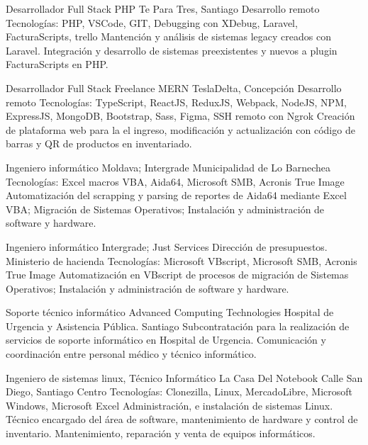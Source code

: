 \documentclass[draft,color,12pt,letterpaper,sans]{moderncv}
\begin{document}
{Desarrollador Full Stack PHP}
{Te Para Tres, Santiago}
{\newline Desarrollo remoto}
{\newline Tecnologías: PHP, VSCode, GIT, Debugging con XDebug, Laravel, FacturaScripts, trello}
{Mantención y análisis de sistemas legacy creados con Laravel. Integración y desarrollo de sistemas preexistentes y nuevos a plugin FacturaScripts en PHP.\newline}

{Desarrollador Full Stack Freelance MERN}
{TeslaDelta, Concepción}
{\newline Desarrollo remoto}
{\newline Tecnologías: TypeScript, ReactJS, ReduxJS, Webpack, NodeJS, NPM, ExpressJS, MongoDB, Bootstrap, Sass, Figma, SSH remoto con Ngrok}
{Creación de plataforma web para la el ingreso, modificación y actualización con código de barras y QR de productos en inventariado.\newline}

{Ingeniero informático}
{Moldava; Intergrade}
{Municipalidad de Lo Barnechea}
{\newline Tecnologías: Excel macros VBA, Aida64, Microsoft SMB, Acronis True Image}
{Automatización del scrapping y parsing de reportes de Aida64 mediante Excel VBA; Migración de Sistemas Operativos; Instalación y administración de software y hardware.\newline}


{Ingeniero informático}
{Intergrade; Just Services}
{Dirección de presupuestos. Ministerio de hacienda}
{\newline Tecnologías: Microsoft VBscript, Microsoft SMB, Acronis True Image}
{Automatización en VBscript de procesos de migración de Sistemas Operativos; Instalación y administración de software y hardware.\newline}

{Soporte técnico informático}
{Advanced Computing Technologies}
{Hospital de Urgencia y Asistencia Pública. Santiago}
{}
{Subcontratación para la realización de servicios de soporte informático en Hospital de Urgencia. Comunicación y coordinación entre personal médico y técnico informático.\newline}

{Ingeniero de sistemas linux, Técnico Informático}
{La Casa Del Notebook}
{Calle San Diego, Santiago Centro}
{\newline Tecnologías: Clonezilla, Linux, MercadoLibre, Microsoft Windows, Microsoft Excel}
{Administración, e instalación de sistemas Linux. Técnico encargado del área de software, mantenimiento de hardware y control de inventario. Mantenimiento, reparación y venta de equipos informáticos.\newline} 
\end{document}
